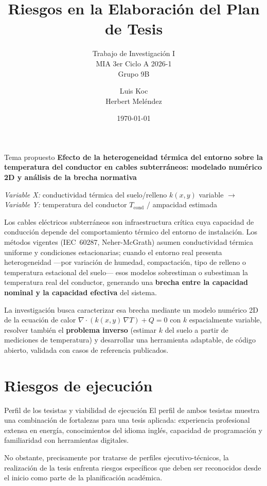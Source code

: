 \documentclass[aspectratio=169]{beamer}
\title{Riesgos en la Elaboración del Plan de Tesis}
\subtitle{Trabajo de Investigación I\\MIA 3er Ciclo A 2026-1\\Grupo 9B}
\author{Luis Koc \\ Herbert Meléndez}
\date{\today}
\begin{document}
\begin{frame}
  \titlepage
\end{frame}

\begin{frame}{Tema propuesto}
\textbf{{\large Efecto de la heterogeneidad térmica del entorno sobre la
temperatura del conductor en cables subterráneos: modelado numérico 2D y
análisis de la brecha normativa}}

\vspace{0.5em}
\small
\textit{Variable X:} conductividad térmica del suelo/relleno $k(x,y)$ variable
\quad$\longrightarrow$\quad
\textit{Variable Y:} temperatura del conductor $T_{\text{cond}}$ / ampacidad estimada

\vspace{0.6em}
\justifying
Los cables eléctricos subterráneos son infraestructura crítica cuya capacidad
de conducción depende del comportamiento térmico del entorno de instalación.
Los métodos vigentes (IEC~60287, Neher-McGrath) asumen conductividad térmica
uniforme y condiciones estacionarias; cuando el entorno real presenta
heterogeneidad —por variación de humedad, compactación, tipo de relleno o
temperatura estacional del suelo— esos modelos sobrestiman o subestiman la
temperatura real del conductor, generando una \textbf{brecha entre la
capacidad nominal y la capacidad efectiva} del sistema.

\vspace{0.3em}
\justifying
La investigación busca caracterizar esa brecha mediante un modelo numérico 2D
de la ecuación de calor $\nabla\cdot(k(x,y)\,\nabla T)+Q=0$ con $k$
espacialmente variable, resolver también el \textbf{problema inverso}
(estimar $k$ del suelo a partir de mediciones de temperatura) y desarrollar
una herramienta adaptable, de código abierto, validada con casos de referencia
publicados.
\end{frame}

\section{Riesgos de ejecución}

\begin{frame}{Perfil de los tesistas y viabilidad de ejecución}
\justifying
El perfil de ambos tesistas muestra una combinación de fortalezas para una tesis aplicada: experiencia profesional extensa en energía, conocimientos del idioma inglés, capacidad de programación y familiaridad con herramientas digitales.

\vspace{0.5em}
No obstante, precisamente por tratarse de perfiles ejecutivo-técnicos, la realización de la tesis enfrenta riesgos específicos que deben ser reconocidos desde el inicio como parte de la planificación académica.
\end{frame}
\end{document}
